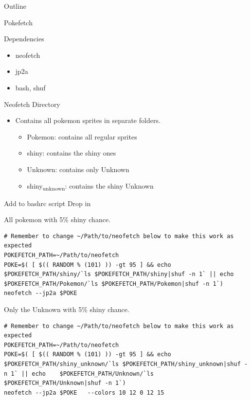 \documentclass[presentation]{beamer}
\author{Miguel}
\date{\today}
\title{}
\begin{document}
\begin{frame}{Outline}
\tableofcontents
\end{frame}

\begin{frame}[label={sec:orgc120f0f}]{Pokefetch}
\begin{block}{Dependencies}
\begin{itemize}
\item neofetch
\item jp2a
\item bash, shuf
\end{itemize}
\end{block}

\begin{block}{Neofetch Directory}
\begin{itemize}
\item Contains all pokemon sprites in separate folders.
\begin{itemize}
\item Pokemon:       contains all regular sprites
\item shiny:         contains the shiny ones
\item Unknown:       contains only Unknown
\item shiny\textsubscript{unknown}: contains the shiny Unknown
\end{itemize}
\end{itemize}
\end{block}
\end{frame}

\begin{frame}[label={sec:org5099c66},fragile]{Add to bashrc script Drop in}
 \begin{block}{All pokemon with 5\% shiny chance.}
\begin{verbatim}
# Remember to change ~/Path/to/neofetch below to make this work as expected
POKEFETCH_PATH=~/Path/to/neofetch
POKE=$( [ $(( RANDOM % (101) )) -gt 95 ] && echo $POKEFETCH_PATH/shiny/`ls $POKEFETCH_PATH/shiny|shuf -n 1` || echo    $POKEFETCH_PATH/Pokemon/`ls $POKEFETCH_PATH/Pokemon|shuf -n 1`)
neofetch --jp2a $POKE
\end{verbatim}
\end{block}

\begin{block}{Only the Unknown with 5\% shiny chance.}
\begin{verbatim}
# Remember to change ~/Path/to/neofetch below to make this work as expected
POKEFETCH_PATH=~/Path/to/neofetch
POKE=$( [ $(( RANDOM % (101) )) -gt 95 ] && echo $POKEFETCH_PATH/shiny_unknown/`ls $POKEFETCH_PATH/shiny_unknown|shuf -n 1` || echo    $POKEFETCH_PATH/Unknown/`ls $POKEFETCH_PATH/Unknown|shuf -n 1`)
neofetch --jp2a $POKE   --colors 10 12 0 12 15
\end{verbatim}
\end{block}
\end{frame}
\end{document}
